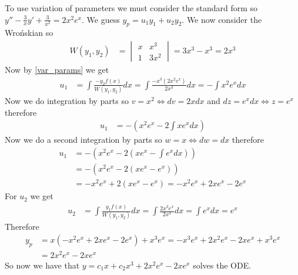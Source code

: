 \documentclass[notes]{subfiles}
\begin{document}
\begin{solution}
    To use variation of parameters we must consider the standard form so $y'' - \frac{3}{x}y' + \frac{3}{x^2} = 2x^2e^x$. We guess $y_p = u_1y_1 + u_2y_2$. We now consider the Wro\'nskian so
    \begin{align*}
        W(y_1, y_2)
        &= \begin{vmatrix}
            x & x^3 \\
            1 & 3x^2
        \end{vmatrix}
        = 3x^3 - x^3 = 2x^3
    \end{align*}
    Now by \eqref{var_params} we get
    \begin{align*}
        u_1
        &= \int \frac{-y_2f(x)}{W(y_1, y_2)} dx
        = \int \frac{-x^3(2x^2 e^x)}{2x^3} dx
        = -\int x^2e^x dx
    \end{align*}
    Now we do integration by parts so $v = x^2 \iff dv = 2xdx$ and $dz = e^xdx \iff z = e^x$ therefore
    \begin{align*}
        u_1
        &= -\left( x^2e^x - 2\int xe^x dx \right)
    \end{align*}
    Now we do a second integration by parts so $w = x \iff dw = dx$ therefore
    \begin{align*}
        u_1
        &= -\left( x^2e^x - 2\left( xe^x - \int e^x dx \right) \right) \\
        &= -\left( x^2e^x - 2\left( xe^x - e^x \right) \right) \\
        &= -x^2e^x + 2\left( xe^x - e^x \right)
        = -x^2e^x + 2xe^x - 2e^x
    \end{align*}
    For $u_2$ we get
    \begin{align*}
        u_2
        &= \int \frac{y_1f(x)}{W(y_1, y_2)} dx
        = \int \frac{2x^3e^x}{2x^3} dx
        = \int e^x dx
        = e^x
    \end{align*}
    Therefore
    \begin{align*}
        y_p
        &= x(-x^2e^x + 2xe^x - 2e^x) + x^3e^x
        = -x^3e^x + 2x^2e^x - 2xe^x + x^3e^x \\
        &= 2x^2e^x - 2xe^x
    \end{align*}
    So now we have that $y = c_1x + c_2x^3 + 2x^2e^x - 2xe^x$ solves the ODE.
\end{solution}
\end{document}
